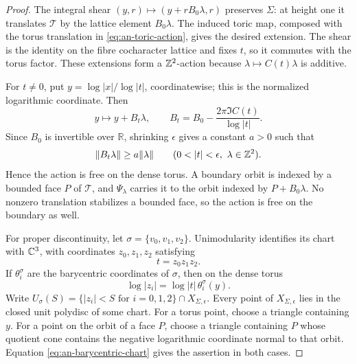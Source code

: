 \begin{proof}
The integral shear $(y,r)\mapsto(y+rB_0\lambda,r)$
preserves $\Sigma$: at height one it translates $\mathcal T$ by the
lattice element $B_0\lambda$.  The induced toric map, composed with the
torus translation in \eqref{eq:an-toric-action}, gives the desired
extension.  The shear is the identity on the fibre cocharacter lattice and
fixes $t$, so it commutes with the torus factor.  These extensions form a
$\mathbb Z^2$-action because $\lambda\mapsto C(t)\lambda$ is additive.

For $t\ne0$, put $y=\log|x|/\log|t|$, coordinatewise; this is the
normalized logarithmic coordinate.  Then
\begin{equation}\label{eq:an-log-coordinate-translation}
 y\longmapsto y+B_t\lambda,
 \qquad
 B_t=B_0-\frac{2\pi\Im C(t)}{\log|t|}.
\end{equation}
Since $B_0$ is invertible over $\mathbb R$, shrinking $\epsilon$
gives a constant $a>0$ such that
\begin{equation}\label{eq:an-singular-value-bound}
 \|B_t\lambda\|\geq a\|\lambda\|
 \qquad(0<|t|<\epsilon,\ \lambda\in\ZZ^2).
\end{equation}
Hence the action is free on the dense torus.  A boundary
orbit is indexed by a bounded face $P$ of $\mathcal T$, and
$\Psi_\lambda$ carries it to the orbit indexed by
$P+B_0\lambda$.  No nonzero translation stabilizes a bounded face, so
the action is free on the boundary as well.

For proper discontinuity, let
$\sigma=\{v_0,v_1,v_2\}$.  Unimodularity identifies its chart with
$\mathbb C^3$, with coordinates $z_0,z_1,z_2$ satisfying
\begin{equation}\label{eq:an-local-t-equation}
 t=z_0z_1z_2.
\end{equation}
If $\theta_i^\sigma$ are the barycentric coordinates of $\sigma$, then
on the dense torus
\begin{equation}\label{eq:an-barycentric-chart}
 \log|z_i|=\log|t|\,\theta_i^\sigma(y).
\end{equation}
Write
$U_\sigma(S)=\{|z_i|<S\text{ for }i=0,1,2\}
\cap X_{\Sigma,\epsilon}$.
Every point of $X_{\Sigma,\epsilon}$ lies in the closed unit polydisc of
some chart.  For a torus point, choose a triangle containing $y$.  For a
point on the orbit of a face $P$, choose a triangle containing $P$ whose
quotient cone contains the negative logarithmic coordinate normal to that
orbit.  Equation \eqref{eq:an-barycentric-chart} gives the assertion in
both cases.


\end{proof}
